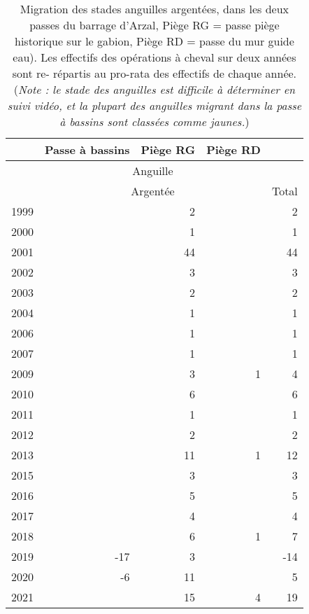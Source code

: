\begin{table}[ht]
\centering
\begin{tabular}{lrrrr}
  \hline
   & \multicolumn{1}{c}{Passe à bassins} & \multicolumn{1}{c}{Piège RG} & \multicolumn{1}{c}{Piège RD} & \\
 \hline
  & \multicolumn{3}{c}{Anguille} & \\
 \hline
  & \multicolumn{3}{c}{Argentée} & Total\\
 \hline
1999 &  & 2 &  & 2 \\ 
  2000 &  & 1 &  & 1 \\ 
  2001 &  & 44 &  & 44 \\ 
  2002 &  & 3 &  & 3 \\ 
  2003 &  & 2 &  & 2 \\ 
  2004 &  & 1 &  & 1 \\ 
  2006 &  & 1 &  & 1 \\ 
  2007 &  & 1 &  & 1 \\ 
  2009 &  & 3 & 1 & 4 \\ 
  2010 &  & 6 &  & 6 \\ 
  2011 &  & 1 &  & 1 \\ 
  2012 &  & 2 &  & 2 \\ 
  2013 &  & 11 & 1 & 12 \\ 
  2015 &  & 3 &  & 3 \\ 
  2016 &  & 5 &  & 5 \\ 
  2017 &  & 4 &  & 4 \\ 
  2018 &  & 6 & 1 & 7 \\ 
  2019 & -17 & 3 &  & -14 \\ 
  2020 & -6 & 11 &  & 5 \\ 
  2021 &  & 15 & 4 & 19 \\ 
   \hline
\end{tabular}
\caption{Migration des stades anguilles argentées, dans les
		deux passes du barrage d'Arzal, Piège RG = passe piège historique
		sur le gabion, Piège RD = passe du mur guide eau). Les effectifs des
		opérations à cheval sur deux années sont re- répartis au pro-rata des effectifs de chaque année. (\textit{Note : le stade des anguilles est difficile à déterminer
		en suivi vidéo, et la plupart des anguilles migrant dans la passe à bassins sont classées comme jaunes.})} 
\label{table_bilanannuel_ang}
\end{table}

